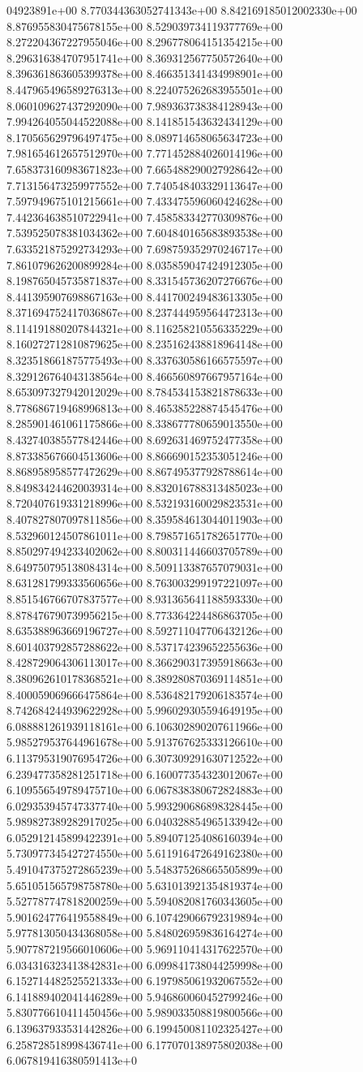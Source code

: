 04923891e+00	8.770344363052741343e+00	8.842169185012002330e+00	8.876955830475678155e+00	8.529039734119377769e+00	8.272204367227955046e+00	8.296778064151354215e+00	8.296316384707951741e+00	8.369312567750572640e+00	8.396361863605399378e+00	8.466351341434998901e+00	8.447965496589276313e+00	8.224075262683955501e+00	8.060109627437292090e+00	7.989363738384128943e+00	7.994264055044522088e+00	8.141851543632434129e+00	8.170565629796497475e+00	8.089714658065634723e+00	7.981654612657512970e+00	7.771452884026014196e+00	7.658373160983671823e+00	7.665488290027928642e+00	7.713156473259977552e+00	7.740548403329113647e+00	7.597949675101215661e+00	7.433475596060424628e+00	7.442364638510722941e+00	7.458583342770309876e+00	7.539525078381034362e+00	7.604840165683893538e+00	7.633521875292734293e+00	7.698759352970246717e+00	7.861079626200899284e+00	8.035859047424912305e+00	8.198765045735871837e+00	8.331545736207276676e+00	8.441395907698867163e+00	8.441700249483613305e+00	8.371694752417036867e+00	8.237444959564472313e+00	8.114191880207844321e+00	8.116258210556335229e+00	8.160272712810879625e+00	8.235162438818964148e+00	8.323518661875775493e+00	8.337630586166575597e+00	8.329126764043138564e+00	8.466560897667957164e+00	8.653097327942012029e+00	8.784534153821878633e+00	8.778686719468996813e+00	8.465385228874545476e+00	8.285901461061175866e+00	8.338677780659013550e+00	8.432740385577842446e+00	8.692631469752477358e+00	8.873385676604513606e+00	8.866690152353051246e+00	8.868958958577472629e+00	8.867495377928788614e+00	8.849834244620039314e+00	8.832016788313485023e+00	8.720407619331218996e+00	8.532193160029823531e+00	8.407827807097811856e+00	8.359584613044011903e+00	8.532960124507861011e+00	8.798571651782651770e+00	8.850297494233402062e+00	8.800311446603705789e+00	8.649750795138084314e+00	8.509113387657079031e+00	8.631281799333560656e+00	8.763003299197221097e+00	8.851546766707837577e+00	8.931365641188593330e+00	8.878476790739956215e+00	8.773364224486863705e+00	8.635388963669196727e+00	8.592711047706432126e+00	8.601403792857288622e+00	8.537174239652255636e+00	8.428729064306113017e+00	8.366290317395918663e+00	8.380962610178368521e+00	8.389280870369114851e+00	8.400059069666475864e+00	8.536482179206183574e+00	8.742684244939622928e+00	5.996029305594649195e+00	6.088881261939118161e+00	6.106302890207611966e+00	5.985279537644961678e+00	5.913767625333126610e+00	6.113795319076954726e+00	6.307309291630712522e+00	6.239477358281251718e+00	6.160077354323012067e+00	6.109556549789475710e+00	6.067838380672824883e+00	6.029353945747337740e+00	5.993290686898328445e+00	5.989827389282917025e+00	6.040328854965133942e+00	6.052912145899422391e+00	5.894071254086160394e+00	5.730977345427274550e+00	5.611916472649162380e+00	5.491047375272865239e+00	5.548375268665505899e+00	5.651051565798758780e+00	5.631013921354819374e+00	5.527787747818200259e+00	5.594082081760343605e+00	5.901624776419558849e+00	6.107429066792319894e+00	5.977813050434368058e+00	5.848026959836164274e+00	5.907787219566010606e+00	5.969110414317622570e+00	6.034316323413842831e+00	6.099841738044259998e+00	6.152714482525521333e+00	6.197985061932067552e+00	6.141889402041446289e+00	5.946860060452799246e+00	5.830776610411450456e+00	5.989033508819800566e+00	6.139637933531442826e+00	6.199450081102325427e+00	6.258728518998436741e+00	6.177070138975802038e+00	6.067819416380591413e+0